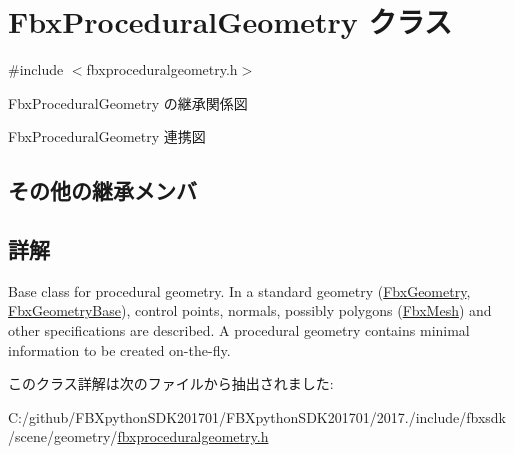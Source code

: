 \hypertarget{class_fbx_procedural_geometry}{}\section{Fbx\+Procedural\+Geometry クラス}
\label{class_fbx_procedural_geometry}


{\ttfamily \#include $<$fbxproceduralgeometry.\+h$>$}



Fbx\+Procedural\+Geometry の継承関係図


Fbx\+Procedural\+Geometry 連携図
\subsection*{その他の継承メンバ}


\subsection{詳解}
Base class for procedural geometry. In a standard geometry (\hyperlink{class_fbx_geometry}{Fbx\+Geometry}, \hyperlink{class_fbx_geometry_base}{Fbx\+Geometry\+Base}), control points, normals, possibly polygons (\hyperlink{class_fbx_mesh}{Fbx\+Mesh}) and other specifications are described. A procedural geometry contains minimal information to be created on-\/the-\/fly. 

このクラス詳解は次のファイルから抽出されました\+:\begin{DoxyCompactItemize}
\item 
C\+:/github/\+F\+B\+Xpython\+S\+D\+K201701/\+F\+B\+Xpython\+S\+D\+K201701/2017./include/fbxsdk/scene/geometry/\hyperlink{fbxproceduralgeometry_8h}{fbxproceduralgeometry.\+h}\end{DoxyCompactItemize}

